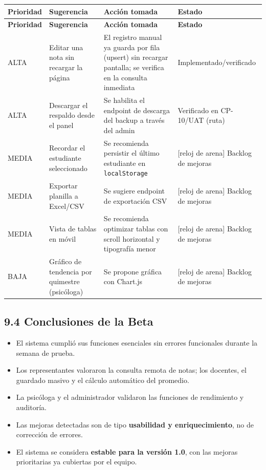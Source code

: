 \documentclass[11pt,a4paper]{article}
\begin{document}
{\small
\begin{longtable}{|p{}|p{}|p{}|p{}|}
\rowcolor{UTECblue}\color{white}\bfseries Prioridad & \color{white}\bfseries Sugerencia & \color{white}\bfseries Acción tomada & \color{white}\bfseries Estado \\ \hline
\endfirsthead
\rowcolor{UTECblue}\color{white}\bfseries Prioridad & \color{white}\bfseries Sugerencia & \color{white}\bfseries Acción tomada & \color{white}\bfseries Estado \\ \hline
\endhead
ALTA & Editar una nota sin recargar la página & El registro manual ya guarda por fila (upsert) sin recargar pantalla; se verifica en la consulta inmediata & {\color{green!60!black}{$\checkmark$}} Implementado/verificado \\ \hline
ALTA & Descargar el respaldo desde el panel & Se habilita el endpoint de descarga del backup a través del admin & {\color{green!60!black}{$\checkmark$}} Verificado en CP-10/UAT (ruta) \\ \hline
MEDIA & Recordar el estudiante seleccionado & Se recomienda persistir el último estudiante en \texttt{localStorage} & [reloj de arena] Backlog de mejoras \\ \hline
MEDIA & Exportar planilla a Excel/CSV & Se sugiere endpoint de exportación CSV & [reloj de arena] Backlog de mejoras \\ \hline
MEDIA & Vista de tablas en móvil & Se recomienda optimizar tablas con scroll horizontal y tipografía menor & [reloj de arena] Backlog de mejoras \\ \hline
BAJA & Gráfico de tendencia por quimestre (psicóloga) & Se propone gráfica con Chart.js & [reloj de arena] Backlog de mejoras \\ \hline
\end{longtable}}


\subsection*{9.4 Conclusiones de la Beta}


\begin{itemize}[leftmargin=*]
\item El sistema cumplió sus funciones esenciales sin errores funcionales durante la semana de prueba.
\item Los representantes valoraron la consulta remota de notas; los docentes, el guardado masivo y el cálculo automático del promedio.
\item La psicóloga y el administrador validaron las funciones de rendimiento y auditoría.
\item Las mejoras detectadas son de tipo \textbf{usabilidad y enriquecimiento}, no de corrección de errores.
\item El sistema se considera \textbf{estable para la versión 1.0}, con las mejoras prioritarias ya cubiertas por el equipo.
\end{itemize}
\end{document}
